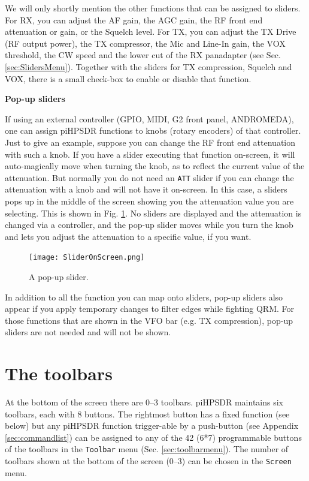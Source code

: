 \documentclass[12pt]{book}
\def\bltt#1{\texttt{\color{blue}#1}}
\def\pH{pi\-HPSDR\xspace}
\begin{document}
We will only shortly mention the other functions that can be assigned to
sliders. For RX, you can adjust the AF gain, the AGC gain, the RF front
end attenuation or gain, or the Squelch level. For TX, you can adjust
the TX Drive (RF output power), the TX compressor, the Mic and Line-In
gain, the VOX threshold, the CW speed and the lower cut of the
RX panadapter (see Sec. \ref{sec:SlidersMenu}).
Together with the sliders for TX compression, Squelch and VOX, there is
a small check-box to enable or disable that function.

\textbf{Pop-up sliders}

If using an external controller (GPIO, MIDI, G2 front panel, ANDROMEDA), one can
assign \pH functions to knobs (rotary encoders) of that controller. Just to give
an example, suppose you can change the RF front end attenuation with such a knob.
If you have a slider executing that function on-screen, it will auto-magically
move when turning the knob, as to reflect the current value of the attenuation.
But normally you do not need an \bltt{ATT} slider if you can change the attenuation
with a knob and will not have it on-screen. In this case, a sliders pops up
in the middle of the screen showing you the attenuation value you are selecting.
This is shown in Fig. \ref{fig:SliderOnScreen}. No sliders are displayed and the
attenuation is changed via a controller, and the pop-up slider moves while you
turn the knob and lets you adjust the attenuation to a specific value, if you want.

\begin{figure}
\center
\texttt{[image: SliderOnScreen.png]}
\caption{A pop-up slider.}
\label{fig:SliderOnScreen}
\end{figure}

In addition to all the function you can map onto sliders, pop-up sliders also appear
if you apply temporary changes to filter edges while fighting QRM. For those functions
that are shown in the VFO bar (e.g. TX compression), pop-up sliders are not needed
and will not be shown.
\section{The toolbars}

At the bottom of the screen there are 0--3 toolbars. \pH maintains
six toolbars, each with 8 buttons. The rightmost button has a fixed
function (see below) but any \pH function trigger-able by a
push-button (see Appendix \ref{sec:commandlist}) can be assigned
to any of the 42 (6*7) programmable buttons of the toolbars in the
\bltt{Toolbar} menu (Sec. \ref{sec:toolbarmenu}). The number of
toolbars shown at the bottom of the screen (0--3) can be
chosen in the \bltt{Screen} menu.
\end{document}
